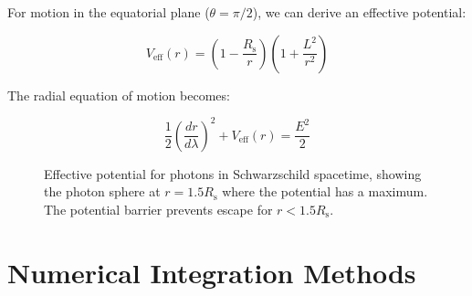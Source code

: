 \documentclass[12pt,a4paper]{article}
\theoremstyle{definition}
\theoremstyle{remark}
\newcommand{\Rs}{R_{\text{s}}}
\begin{document}
For motion in the equatorial plane ($\theta = \pi/2$), we can derive an effective potential:

\begin{equation}
    V_{\text{eff}}(r) = \left(1 - \frac{\Rs}{r}\right)\left(1 + \frac{L^2}{r^2}\right)
\end{equation}

The radial equation of motion becomes:

\begin{equation}
    \frac{1}{2}\left(\frac{dr}{d\lambda}\right)^2 + V_{\text{eff}}(r) = \frac{E^2}{2}
\end{equation}

\begin{figure}[H]
    \centering
    \caption{Effective potential for photons in Schwarzschild spacetime, showing the photon sphere at $r = 1.5\Rs$ where the potential has a maximum. The potential barrier prevents escape for $r < 1.5\Rs$.}
    \label{fig:effective_potential}
\end{figure}

\section{Numerical Integration Methods}
\end{document}
